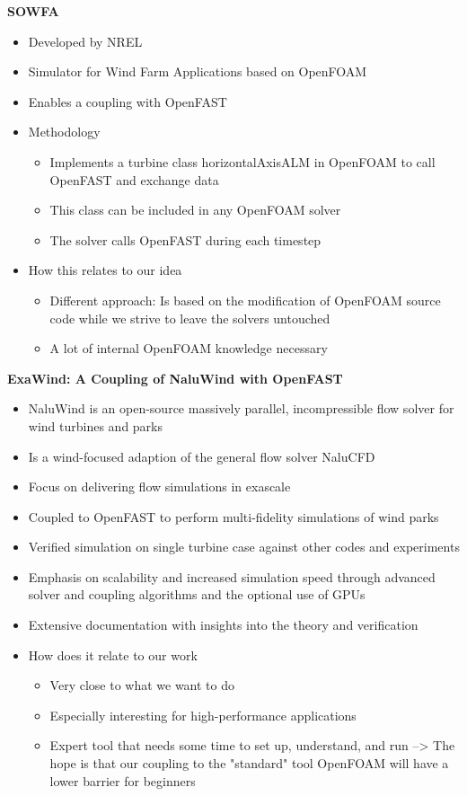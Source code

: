 \textbf{SOWFA} \cite{Churchfield:2012}
\begin{itemize}
	\item Developed by NREL
	\item Simulator for Wind Farm Applications based on OpenFOAM
	\item Enables a coupling with OpenFAST
	\item Methodology
	\begin{itemize}
		\item Implements a turbine class horizontalAxisALM in OpenFOAM to call OpenFAST and exchange data
		\item This class can be included in any OpenFOAM solver
		\item The solver calls OpenFAST during each timestep
	\end{itemize}
	\item How this relates to our idea
	\begin{itemize}
		\item Different approach: Is based on the modification of OpenFOAM source code while we strive to leave the solvers untouched
		\item A lot of internal OpenFOAM knowledge necessary
		\\
	\end{itemize}
\end{itemize}

\textbf{ExaWind: A Coupling of NaluWind with OpenFAST} \cite{Sprague:2019}\\
\begin{itemize}
	\item NaluWind is an open-source massively parallel, incompressible flow solver for wind turbines and parks
	\item Is a wind-focused adaption of the general flow solver NaluCFD
	\item Focus on delivering flow simulations in exascale
	\item Coupled to OpenFAST to perform multi-fidelity simulations of wind parks
	\item Verified simulation on single turbine case against other codes and experiments
	\item Emphasis on scalability and increased simulation speed through advanced solver and coupling algorithms and the optional use of GPUs
	\item Extensive documentation with insights into the theory and verification 
	\item How does it relate to our work
	\begin{itemize}
		\item Very close to what we want to do
		\item Especially interesting for high-performance applications
		\item Expert tool that needs some time to set up, understand, and run --> The hope is that our coupling to the "standard" tool OpenFOAM will have a lower barrier for beginners
	\end{itemize}
\end{itemize}

